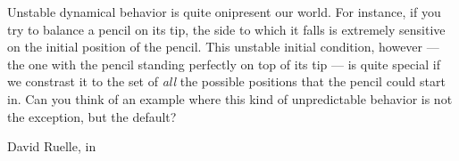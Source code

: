 \documentclass[../main]{subfiles}
\begin{document}
Unstable dynamical behavior is quite onipresent our world. For instance, if you try to balance a pencil on its tip, the side to which it falls is extremely sensitive on the initial position of the pencil. This unstable initial condition, however --- the one with the pencil standing perfectly on top of its tip --- is quite special if we constrast it to the set of \emph{all} the possible positions that the pencil could start in. Can you think of an example where this kind of unpredictable behavior is not the exception, but the default?

David Ruelle, in
\end{document}

